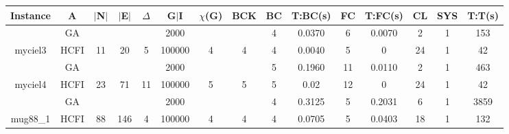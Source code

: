 \documentclass[10pt]{article}
\begin{document}
\begin{center}
\begin{table}[H]
\begin{tabular}{|c|c|c|c|c|c|c|c|c|c|c|c|c|c|c|}
\hline
Instance& A &$|$N$|$ & $|$E$|$ & $\Delta$ & G$|$I & $\chi$(G) &BCK&BC & T:BC(s) & FC & T:FC(s) & CL & SYS & T:T(s) \\ \hline \hline

	&GA&       &                   &                     &2000         &     \cellcolor{yellow} & {\cellcolor{yellow}}& {{\cellcolor{green}4}}
&0.0370   &6        &0.0070                   &2                   &1          &153        \\ \cline{2-2} \cline{6-6} \cline{9-15}
 \multirow{-2}{*}{myciel3} &HCFI   &\multirow{-2}{*}{11}   &\multirow{-2}{*}{20}     &\multirow{-2}{*}{5}     &100000     &\multirow{-2}{*}{\cellcolor{yellow}4}      & \multirow{-2}{*}{\cellcolor{yellow}4}    &{\cellcolor{green}4}     &0.0040          &5    &0         &24    &1     &       42 \\ \hline \hline
	&GA&       &                   &                     &2000         &     \cellcolor{yellow} & {\cellcolor{yellow}}& {{\cellcolor{green}5}}
&0.1960    &11        & 0.0110                  & 2                    & 1         &463         \\ \cline{2-2} \cline{6-6} \cline{9-15}
 \multirow{-2}{*}{myciel4} &HCFI   &\multirow{-2}{*}{23}   &\multirow{-2}{*}{71}     &\multirow{-2}{*}{11}     &100000      &\multirow{-2}{*}{\cellcolor{yellow}5}      & \multirow{-2}{*}{\cellcolor{yellow}5}    &{\cellcolor{green}5}     &0.02         &12    &0         & 24   &1     &42        \\ \hline \hline
	&GA&       &                   &                     &2000         &     \cellcolor{yellow} & {\cellcolor{yellow}}& {{\cellcolor{green}4}}
& 0.3125      & 5       &0.2031                    & 6                   & 1         &3859         \\ \cline{2-2} \cline{6-6} \cline{9-15}
 \multirow{-2}{*}{mug88\_1} &HCFI   &\multirow{-2}{*}{88}   &\multirow{-2}{*}{146}     &\multirow{-2}{*}{4}     &100000     &\multirow{-2}{*}{\cellcolor{yellow}4}      & \multirow{-2}{*}{\cellcolor{yellow}4}    &{\cellcolor{green}4}     &0.0705         &5    &0.0403         &18    &1     & 132       \\ \hline \hline

\end{tabular}
\end{table}
\end{center}
\end{document}
